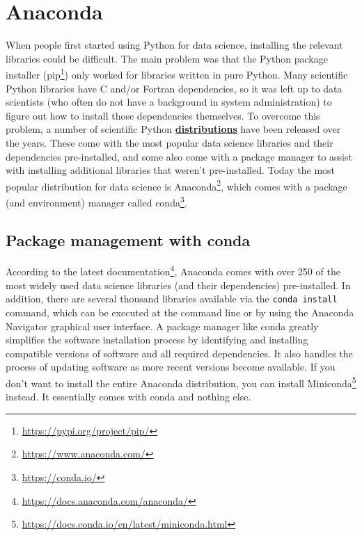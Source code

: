 \documentclass[
]{krantz}
\renewcommand{\href}[2]{#2\footnote{\url{#1}}}
\newcommand{\gref}[2]{\hyperlink{#2}{\textbf{#1}}}
\begin{document}
\hypertarget{anaconda}{%
\chapter{Anaconda}\label{anaconda}}

When people first started using Python for data science,
installing the relevant libraries could be difficult.
The main problem was that the Python package installer (\href{https://pypi.org/project/pip/}{pip})
only worked for libraries written in pure Python.
Many scientific Python libraries have C and/or Fortran dependencies,
so it was left up to data scientists
(who often do not have a background in system administration)
to figure out how to install those dependencies themselves.
To overcome this problem,
a number of scientific Python \gref{distributions}{software\_distribution}
have been released over the years.
These come with the most popular data science libraries and their dependencies pre-installed,
and some also come with a package manager to assist
with installing additional libraries that weren't pre-installed.
Today the most popular distribution for data science is \href{https://www.anaconda.com/}{Anaconda},
which comes with a package (and environment) manager called \href{https://conda.io/}{conda}.

\hypertarget{anaconda-conda-package-management}{%
\section{Package management with conda}\label{anaconda-conda-package-management}}

According to the \href{https://docs.anaconda.com/anaconda/}{latest documentation},
Anaconda comes with over 250 of the most widely used data science libraries (and their dependencies) pre-installed.
In addition, there are several thousand libraries available via the \texttt{conda\ install} command,
which can be executed at the command line or by using the Anaconda Navigator graphical user interface.
A package manager like conda greatly simplifies the software installation process
by identifying and installing compatible versions of software and all required dependencies.
It also handles the process of updating software as more recent versions become available.
If you don't want to install the entire Anaconda distribution,
you can install \href{https://docs.conda.io/en/latest/miniconda.html}{Miniconda} instead.
It essentially comes with conda and nothing else.
\end{document}
